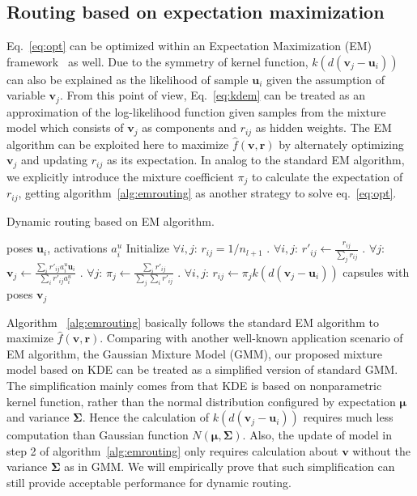 \documentclass[runningheads]{llncs}
\begin{document}
\subsection{Routing based on expectation maximization}
Eq.~\ref{eq:opt} can be optimized within an Expectation Maximization (EM) framework~\cite{dempster1977maximum} as well. Due to the symmetry of kernel function, $k(d(\boldsymbol{v}_j-\boldsymbol{u}_i))$ can also be explained as the likelihood of sample $\boldsymbol{u}_i$ given the assumption of variable $\boldsymbol{v}_j$. From this point of view, Eq.~\ref{eq:kdem} can be treated as an approximation of the log-likelihood function given samples from the mixture model which consists of $\boldsymbol{v}_j$ as components and $r_{ij}$ as hidden weights. The EM algorithm can be exploited here to maximize $\hat{f}(\boldsymbol{v},\boldsymbol{r})$ by alternately optimizing $\boldsymbol{v}_j$ and updating $r_{ij}$ as its expectation. In analog to the standard EM algorithm, we explicitly introduce the mixture coefficient $\pi_j$ to calculate the expectation of $r_{ij}$, getting algorithm~\ref{alg:emrouting} as another strategy to solve eq.~\ref{eq:opt}.

\begin{algorithm}
  \caption{Dynamic routing based on EM algorithm.}
  \label{alg:emrouting}
  \begin{algorithmic}
   \REQUIRE poses $\boldsymbol{u}_{i}$, activations $a_i^u$
   \STATE Initialize $\forall{i,j}$: $r_{ij}=1/n_{l+1}$
   . $\forall{i,j}$: $r'_{ij}\gets{\frac{r_{ij}}{\sum_jr_{ij}}}$
   . $\forall{j}$: $\boldsymbol{v}_j\gets{\frac{\sum_ir'_{ij}a_i^u\boldsymbol{u}_{i}}{\sum_ir'_{ij}a_i^u}}$
   . $\forall{j}$: $\pi_j\gets{\frac{\sum_ir'_{ij}}{\sum_j\sum_ir'_{ij}}}$
   . $\forall{i,j}$: $r_{ij}\gets{\pi_j}k(d(\boldsymbol{v}_j-\boldsymbol{u}_{i}))$
   \ENDFOR
   \RETURN capsules with poses $\boldsymbol{v}_j$
  \end{algorithmic}
\end{algorithm}

Algorithm ~\ref{alg:emrouting} basically follows the standard EM algorithm to maximize $\hat{f}(\boldsymbol{v},\boldsymbol{r})$. Comparing with another well-known application scenario of EM algorithm, the Gaussian Mixture Model (GMM), our proposed mixture model based on KDE can be treated as a simplified version of standard GMM. The simplification mainly comes from that KDE is based on nonparametric kernel function, rather than the normal distribution configured by expectation $\boldsymbol{\mu}$ and variance $\boldsymbol{\Sigma}$. Hence the calculation of $k(d(\boldsymbol{v}_j-\boldsymbol{u}_{i}))$ requires much less computation than Gaussian function $N(\boldsymbol{\mu},\boldsymbol{\Sigma})$. Also, the update of model in step 2 of algorithm~\ref{alg:emrouting} only requires calculation about $\boldsymbol{v}$ without the variance $\boldsymbol{\Sigma}$ as in GMM. We will empirically prove that such simplification can still provide acceptable performance for dynamic routing.
\end{document}
